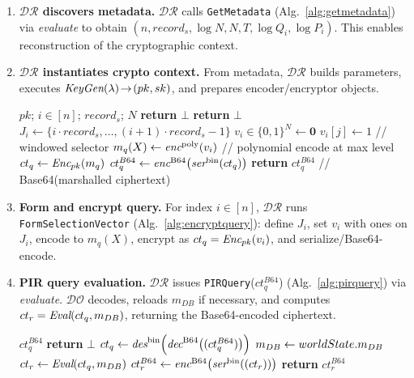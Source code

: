 \documentclass[letterpaper,journal]{IEEEtran}
\newcommand{\encB}[1]{\emph{enc}^{\mathrm{B64}}\!\left(#1\right)}
\newcommand{\decB}[1]{\emph{dec}^{\mathrm{B64}}\!\left(#1\right)}
\newcommand{\encP}[1]{\emph{enc}^{\mathrm{poly}}\!\left(#1\right)}
\newcommand{\ser}[1]{\emph{ser}^{\mathrm{bin}}\!\left(#1\right)}
\newcommand{\des}[1]{\emph{des}^{\mathrm{bin}}\!\left(#1\right)}
\begin{document}
\begin{enumerate}
    \item \textbf{$\mathcal{DR}$ discovers metadata.}  
    $\mathcal{DR}$ calls \texttt{GetMetadata} (Alg.~\ref{alg:getmetadata}) via \emph{evaluate} 
    to obtain $(n,record_s,\log N,N,T,\log Q_i,\log P_i)$. 
    This enables reconstruction of the cryptographic context. 

    \item \textbf{$\mathcal{DR}$ instantiates crypto context.}  
    From metadata, $\mathcal{DR}$ builds parameters, executes $\emph{KeyGen}(\lambda)\!\to\!(pk,sk)$, 
    and prepares encoder/encryptor objects. 

    \begin{algorithm}[!htbp]
      \caption{\texttt{FormSelectionVector} (client)}
      \label{alg:encryptquery}
      \begin{algorithmic}[1]
      \REQUIRE $pk$; $i\in[n]$; $record_s$; $N$
       \STATE \textbf{return} $\bot$ \ENDIF
       \STATE \textbf{return} $\bot$ \ENDIF
      \STATE $J_i \gets \{i\cdot record_s,\dots,(i+1)\cdot record_s-1\}$
      \STATE ${v}_i \in \{0,1\}^{N} \gets \mathbf{0}$
       \STATE ${v}_i[j] \gets 1$ \ENDFOR \hfill // windowed selector
      \STATE $m_q(X) \gets \encP{{v}_i}$ \hfill // polynomial encode at max level
      \STATE $ct_q \gets \emph{Enc}_{pk}(m_q)$
      \STATE $ct_q^{B64} \gets \encB{\ser{ct_q}}$
      \STATE \textbf{return } $ct_q^{B64}$ \hfill // Base64(marshalled ciphertext)
      \end{algorithmic}
    \end{algorithm}

    \item \textbf{Form and encrypt query.}  
    For index $i\in[n]$, $\mathcal{DR}$ runs \texttt{FormSelectionVector} (Alg.~\ref{alg:encryptquery}): 
    define $J_i$, set ${v}_i$ with ones on $J_i$, encode to $m_q(X)$, encrypt as $ct_q=\emph{Enc}_{pk}({v}_i)$, 
    and serialize/Base64-encode. 

    \item \textbf{PIR query evaluation.}  
    $\mathcal{DR}$ issues \texttt{PIRQuery}($ct_q^{B64}$) (Alg.~\ref{alg:pirquery}) via \emph{evaluate}. 
    $\mathcal{DO}$ decodes, reloads \emph{$m_{DB}$} if necessary, and computes 
    $ct_r=\emph{Eval}(ct_q,\emph{$m_{DB}$})$, returning the Base64-encoded ciphertext.   

    \begin{algorithm}[!htbp]
      \caption{\texttt{PIRQuery} (chaincode)}
      \label{alg:pirquery}
      \begin{algorithmic}[1]
      \REQUIRE $ct_q^{B64}$
          \STATE \textbf{return} $\bot$ 
      \ENDIF
      \STATE $ct_q \gets \des{\decB{(ct_q^{B64})}}$
          \STATE $\emph{$m_{DB}$} \gets worldState.\emph{$m_{DB}$}$
      \ENDIF
      \STATE $ct_r \gets \emph{Eval}(ct_q, \emph{$m_{DB}$})$
      \STATE $ct_r^{B64} \gets \encB{\ser{(ct_r)}}$
      \STATE \textbf{return} $ct_r^{B64}$
      \end{algorithmic}
    \end{algorithm}


\end{enumerate}
\end{document}
